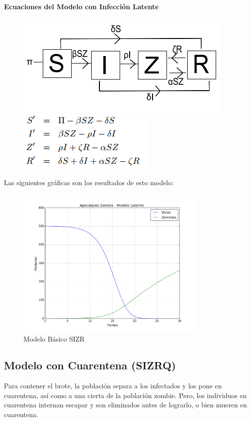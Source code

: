 \documentclass[12pt]{article}
\begin{document}
\textbf{Ecuaciones del Modelo con Infección Latente}
\begin{figure}[H]
\centering
\includegraphics[scale=0.5]{LModeloG.png}
\hspace{0.5cm}
\includegraphics[scale=0.65]{LModelo.png}
\end{figure}

Las siguientes gráficas son los resultados de esto modelo:
\begin{figure}[H]
\centering
\includegraphics[height=7.5cm]{Latente.png}
\caption{Modelo Básico SIZR}
\end{figure} 
\pagebreak

\subsection{Modelo con Cuarentena (SIZRQ)}
Para contener el brote, la población separa a los infectados y los pone en cuarentena, así como a una cierta de la población zombie. Pero, los individuos en cuarentena internan escapar y son eliminados antes de lograrlo, o bien mueren en cuarentena.
\end{document}
